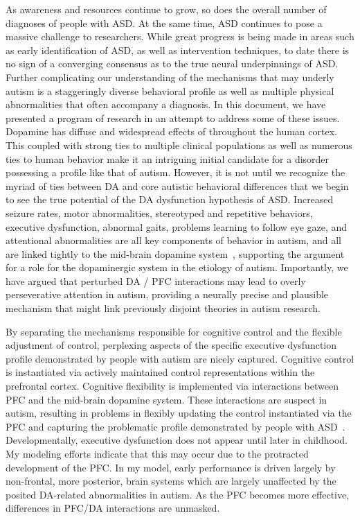 %
%

As awareness and resources continue to grow, so does the overall number of diagnoses of people with ASD.  At the same time, ASD continues to pose a massive challenge to researchers.  While great progress is being made in areas such as early identification of ASD, as well as intervention techniques, to date there is no sign of a converging consensus as to the true neural underpinnings of ASD.  Further complicating our understanding of the mechanisms that may underly autism is a staggeringly diverse behavioral profile as well as multiple physical abnormalities that often accompany a diagnosis.  In this document, we have presented a program of research in an attempt to address some of these issues.  Dopamine has diffuse and widespread effects of throughout the human cortex. This coupled with strong ties to multiple clinical populations as well as numerous ties to human behavior make it an intriguing initial candidate for a disorder possessing a profile like that of autism.  However, it is not until we recognize the myriad of ties between DA and core autistic behavioral differences that we begin to see the true potential of the DA dysfunction hypothesis of ASD.  Increased seizure rates, motor abnormalities, stereotyped and repetitive behaviors, executive dysfunction, abnormal gaits, problems learning to follow eye gaze, and attentional abnormalities are all key components of behavior in autism, and all are linked tightly to the mid-brain dopamine system~\cite{RefWorks:99,RefWorks:100,RefWorks:102,HillEL:2004:AutismExecutiveDysfunction,Ozonoff:1991:AutismExecutiveDysfunction,RefWorks:1,RefWorks:3,RefWorks:5,RefWorks:2,RefWorks:109}, supporting the argument for a role for the dopaminergic system in the etiology of autism. Importantly, we have argued that perturbed DA / PFC interactions may lead to overly perseverative attention in autism, providing a neurally precise and plausible mechanism that might link previously disjoint theories in autism research. 

By separating the mechanisms responsible for cognitive control and the flexible adjustment of control, perplexing aspects of the specific executive dysfunction profile demonstrated by people with autism are nicely captured.  Cognitive control is instantiated via actively maintained control representations within the prefrontal cortex.  Cognitive flexibility is implemented via interactions between PFC and the mid-brain dopamine system.  These interactions are suspect in autism, resulting in problems in flexibly updating the control instantiated via the PFC and capturing the problematic profile demonstrated by people with ASD~\cite{HillEL:2004:AutismExecutiveDysfunction,Ozonoff:1991:AutismExecutiveDysfunction}.  Developmentally, executive dysfunction does not appear until later in childhood.  My modeling efforts indicate that this may occur due to the protracted development of the PFC.  In my model, early performance is driven largely by non-frontal, more posterior, brain systems which are largely unaffected by the posited DA-related abnormalities in autism.  As the PFC becomes more effective, differences in PFC/DA interactions are unmasked.  

